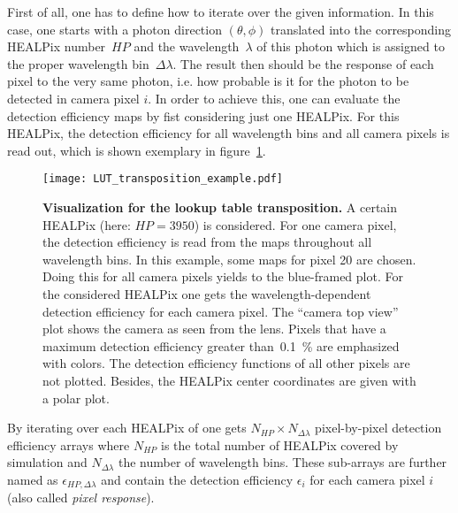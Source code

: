 First of all, one has to define how to iterate over the given information. In this case, one starts with a photon direction $(\theta,\phi)$ translated into the corresponding HEALPix number~$HP$ and the wavelength~$\lambda$ of this photon which is assigned to the proper wavelength bin~$\Delta\lambda$. The result then should be the response of each pixel to the very same photon, i.e. how probable is it for the photon to be detected in camera pixel $i$. In order to achieve this, one can evaluate the detection efficiency maps by fist considering just one HEALPix. For this HEALPix, the detection efficiency for all wavelength bins and all camera pixels is read out, which is shown exemplary in figure~\ref{lut:transpose_example}. 

\begin{figure}[H]
	\texttt{[image: LUT\_transposition\_example.pdf]}
	\caption[Visualization for the lookup table transposition]{\textbf{Visualization for the lookup table transposition.} A certain HEALPix (here: $HP=\num{3950}$) is considered. For one camera pixel, the detection efficiency is read from the maps throughout all wavelength bins. In this example, some maps for pixel \num{20} are chosen. Doing this for all camera pixels yields to the blue-framed plot. For the considered HEALPix one gets the wavelength-dependent detection efficiency for each camera pixel. The \enquote{camera top view} plot shows the camera as seen from the lens. Pixels that have a maximum detection efficiency greater than~\SI{0.1}{\percent} are emphasized with colors. The detection efficiency functions of all other pixels are not plotted. Besides, the HEALPix center coordinates are given with a polar plot.}
	\label{lut:transpose_example}
\end{figure}

By iterating over each HEALPix of one gets $N_{HP}\times N_{\Delta\lambda}$ pixel-by-pixel detection efficiency arrays where $N_{HP}$ is the total number of HEALPix covered by simulation and $N_{\Delta\lambda}$ the number of wavelength bins. These sub-arrays are further named as $\epsilon_{HP,\Delta\lambda}$ and contain the detection efficiency $\epsilon_i$ for each camera pixel $i$ (also called \textit{pixel response}). 

